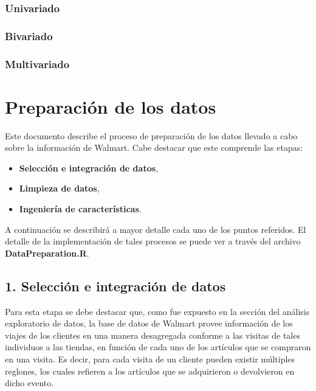 \documentclass[]{book}
\providecommand{\tightlist}{%
  \setlength{\itemsep}{0pt}\setlength{\parskip}{0pt}}
\begin{document}
\hypertarget{univariado}{%
\subsection{Univariado}\label{univariado}}

\hypertarget{bivariado}{%
\subsection{Bivariado}\label{bivariado}}

\hypertarget{multivariado}{%
\subsection{Multivariado}\label{multivariado}}

\hypertarget{preparaciuxf3n-de-los-datos}{%
\chapter{Preparación de los datos}\label{preparaciuxf3n-de-los-datos}}

Este documento describe el proceso de preparación de los datos llevado a cabo sobre la información de Walmart. Cabe destacar que este comprende las etapas:

\begin{itemize}
\tightlist
\item
  \textbf{Selección e integración de datos},
\item
  \textbf{Limpieza de datos},
\item
  \textbf{Ingeniería de características}.
\end{itemize}

A continuación se describirá a mayor detalle cada uno de los puntos referidos. El detalle de la implementación de tales procesos se puede ver a través del archivo \textbf{DataPreparation.R}.

\hypertarget{selecciuxf3n-e-integraciuxf3n-de-datos}{%
\section{1. Selección e integración de datos}\label{selecciuxf3n-e-integraciuxf3n-de-datos}}

Para esta etapa se debe destacar que, como fue expuesto en la sección del análisis exploratorio de datos, la base de datos de Walmart provee información de los viajes de los clientes en una manera desagregada conforme a las visitas de tales individuos a las tiendas, en función de cada uno de los artículos que se compraron en una visita. Es decir, para cada visita de un cliente pueden existir múltiples reglones, los cuales refieren a los artículos que se adquirieron o devolvieron en dicho evento.
\end{document}
